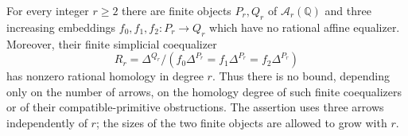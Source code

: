 \begin{theorem}
\label{C4:three-arrow-high-degree}
For every integer $r\geq2$ there are finite objects $P_r,Q_r$ of
$\mathcal A_r(\mathbb Q)$ and three increasing embeddings
$f_0,f_1,f_2:P_r\to Q_r$ which have no rational affine equalizer.
Moreover, their finite simplicial coequalizer
\[
 R_r=\Delta^{Q_r}/(f_0\Delta^{P_r}=f_1\Delta^{P_r}
                         =f_2\Delta^{P_r})
\]
has nonzero rational homology in degree $r$. Thus there is no
bound, depending only on the number of arrows, on the homology
degree of such finite coequalizers or of their compatible-primitive
obstructions. The assertion uses three arrows independently of $r$;
the sizes of the two finite objects are allowed to grow with $r$.
\end{theorem}
